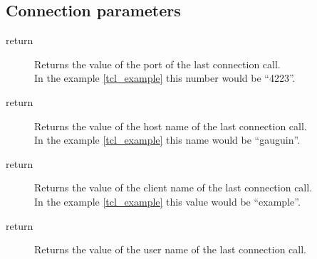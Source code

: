   \subsection{Connection parameters}
	\begin{method}{ }
	  \begin{description}
	    \item[ return]
		Returns the value of the port of the last connection call.\\
		In the example \ref{tcl_example} this number 
		 would be ``4223''.
	  \end{description}
	\end{method}
	\begin{method}{ }
	  \begin{description}
	    \item[ return]
		Returns the value of the host name 
		of the last connection call. \\
		In the example \ref{tcl_example} this name
		 would be ``gauguin''.
	  \end{description}
	\end{method}
	\begin{method}{ }
	  \begin{description}
	    \item[ return]
		Returns the value of the client name of the 
		last connection call. \\
		In the example \ref{tcl_example} this value
		 would be ``example''.
	  \end{description}
	\end{method}
	\begin{method}{ }
	  \begin{description}
	    \item[ return]
		Returns the value of the user name of the
		 last connection call.
	  \end{description}
	\end{method}
